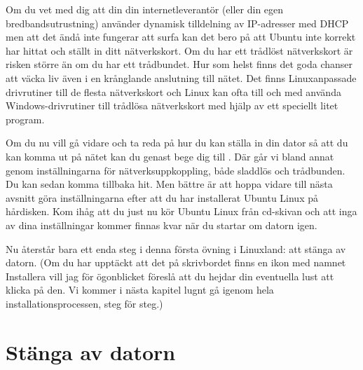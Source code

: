 \documentclass[a4paper,final]{memoir} %
\begin{document}
\xnegskip{}

Om du vet med dig att din din internetleverantör (eller din egen bredbandsutrustning) använder dynamisk tilldelning av IP-adresser med DHCP men att det ändå inte fungerar att surfa kan det bero på att Ubuntu inte korrekt har hittat och ställt in ditt nätverkskort. Om du har ett trådlöst nätverkskort är risken större än om du har ett trådbundet. Hur som helst finns det goda chanser att väcka liv även i en krånglande anslutning till nätet. Det finns Linuxanpassade drivrutiner till de flesta nätverkskort och Linux kan ofta till och med använda Windows-drivrutiner till trådlösa nätverkskort med hjälp av ett speciellt litet program.

Om du nu vill gå vidare och ta reda på hur du kan ställa in din dator så att du kan komma ut på nätet kan du genast bege dig till . Där går vi bland annat genom inställningarna för nätverksuppkoppling, både sladdlös och trådbunden. Du kan sedan komma tillbaka hit. Men bättre är att hoppa vidare till nästa avsnitt göra inställningarna efter att du har installerat Ubuntu Linux på hårdisken. Kom ihåg att du just nu kör Ubuntu Linux från cd-skivan och att inga av dina inställningar kommer finnas kvar när du startar om datorn igen.


Nu återstår bara ett enda steg i denna första övning i Linuxland: att stänga av datorn. (Om du har upptäckt att det på skrivbordet finns en ikon med namnet Installera vill jag för ögonblicket föreslå att du hejdar din eventuella lust att klicka på den. Vi kommer i nästa kapitel lugnt gå igenom hela installationsprocessen, steg för steg.)


\section{Stänga av datorn}
\end{document}
